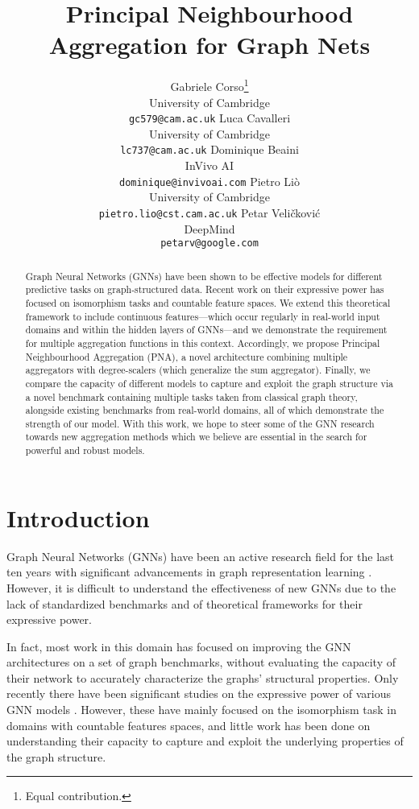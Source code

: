 \documentclass{article}
\title{Principal Neighbourhood Aggregation for Graph Nets}
\author{Gabriele Corso\thanks{Equal contribution.}\\
  \small University of Cambridge\\
  \texttt{gc579@cam.ac.uk}
  \And
  Luca Cavalleri\\
  \small University of Cambridge\\
  \texttt{lc737@cam.ac.uk}
  \And
  Dominique Beaini\\
  \small InVivo AI\\
  \texttt{dominique@invivoai.com}
  \AND
  Pietro Li\`{o}\\
  \small University of Cambridge\\
  \texttt{pietro.lio@cst.cam.ac.uk}
  \And
  Petar Veli\v{c}kovi\'{c}\\
  \small DeepMind\\
  \texttt{petarv@google.com}
}
\begin{document}
\maketitle

\begin{abstract}
    Graph Neural Networks (GNNs) have been shown to be effective models for different predictive tasks on graph-structured data. Recent work on their expressive power has focused on isomorphism tasks and countable feature spaces. We extend this theoretical framework to include continuous features---which occur regularly in real-world input domains and within the hidden layers of GNNs---and we demonstrate the requirement for multiple aggregation functions in this context. Accordingly, we propose Principal Neighbourhood Aggregation (PNA), a novel architecture combining multiple aggregators with degree-scalers (which generalize the sum aggregator). Finally, we compare the capacity of different models to capture and exploit the graph structure via a novel benchmark containing multiple tasks taken from classical graph theory, alongside existing benchmarks from real-world domains, all of which demonstrate the strength of our model. With this work, we hope to steer some of the GNN research towards new aggregation methods which we believe are essential in the search for powerful and robust models.
    
\end{abstract}

\section{Introduction}

Graph Neural Networks (GNNs) have been an active research field for the last ten years with significant advancements in graph representation learning \cite{scarselli2009, Bronstein_2017, battaglia2018relational, hamilton2017representation}. However, it is difficult to understand the effectiveness of new GNNs due to the lack of standardized benchmarks \cite{dwivedi2020benchmarking} and of theoretical frameworks for their expressive power.

In fact, most work in this domain has focused on improving the GNN architectures on a set of graph benchmarks, without evaluating the capacity of their network to accurately characterize the graphs' structural properties. Only recently there have been significant studies on the expressive power of various GNN models \cite{xu2018gin, garg2020generalization, morris2018weisfeiler, murphy2019relational, sato2020survey}. However, these have mainly focused on the isomorphism task in domains with countable features spaces, and little work has been done on understanding their capacity to capture and exploit the underlying properties of the graph structure. 
\end{document}
